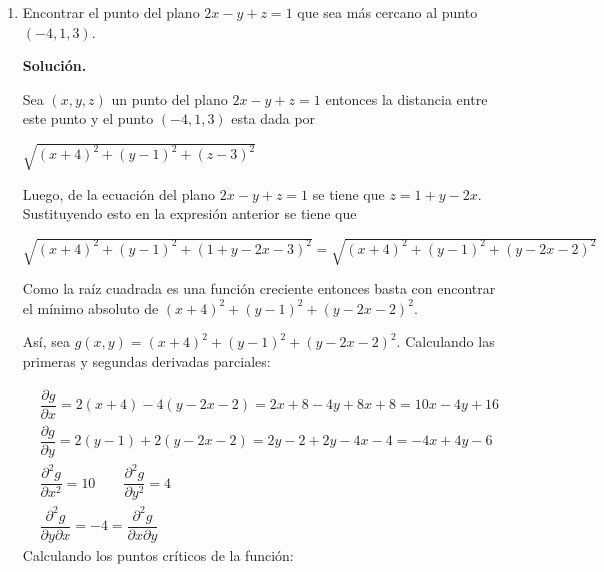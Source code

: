 \documentclass[fleqn, 12pt]{article}
\newcommand{\derivadaparcial}[2]{\dfrac{\partial {#1}}{\partial {#2}}}
\newcommand{\derivadaparcialn}[3]{\dfrac{\partial^{#3} {#1}}{\partial {#2}^{#3}}}
\newcommand{\derivadaparcialnd}[3]{\dfrac{\partial^{2} {#1}}{\partial {#3} \partial {#2}}}
\begin{document}
\begin{enumerate}
\begin{enumerate}
            

            
            
        \end{enumerate}
        \item Encontrar el punto del plano $ 2x - y + z = 1 $ que sea más cercano al punto $ (-4,1,3) $.

        \textbf{Solución.}
        
        Sea $ (x,y,z) $ un punto del plano $ 2x - y + z = 1 $ entonces la distancia entre este punto y el punto $ (-4,1,3) $ esta dada por 

        $ \sqrt{(x + 4)^2 + (y - 1)^2 + (z - 3)^2} $

        Luego, de la ecuación del plano $ 2x - y + z = 1 $ se tiene que $ z = 1 + y - 2x $. Sustituyendo esto en la expresión anterior se tiene que

        $ \sqrt{(x + 4)^2 + (y - 1)^2 + (1 + y - 2x - 3)^2} = \sqrt{(x + 4)^2 + (y - 1)^2 + (y - 2x - 2)^2} $

        Como la raíz cuadrada es una función creciente entonces basta con encontrar el mínimo absoluto de $ (x + 4)^2 + (y - 1)^2 + (y - 2x - 2)^2 $.

        Así, sea $ g(x,y) = (x + 4)^2 + (y - 1)^2 + (y - 2x - 2)^2 $. Calculando las primeras y segundas derivadas parciales:

        \begin{align*}
            & \derivadaparcial{g}{x} =  2(x + 4) - 4(y - 2x - 2) = 2x + 8 - 4y + 8x + 8 = 10x - 4y + 16 \\
            & \derivadaparcial{g}{y} = 2(y - 1) + 2(y - 2x - 2) = 2y - 2 + 2y - 4x - 4 = -4x + 4y - 6 \\
            & \derivadaparcialn{g}{x}{2} = 10 \qquad \derivadaparcialn{g}{y}{2} = 4 \\
            & \derivadaparcialnd{g}{x}{y} = -4 = \derivadaparcialnd{g}{y}{x}
        \end{align*}
        Calculando los puntos críticos de la función:


\end{enumerate}
\end{document}
